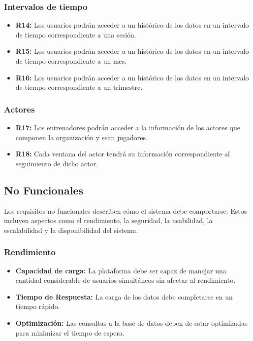 \subsubsection{Intervalos de tiempo}
\begin{itemize}
    \item \textbf{R14:} Los usuarios podrán acceder a un histórico de los datos en un intervalo de tiempo correspondiente a una sesión.
    
    \item \textbf{R15:} Los usuarios podrán acceder a un histórico de los datos en un intervalo de tiempo correspondiente a un mes.
    
    \item \textbf{R16:} Los usuarios podrán acceder a un histórico de los datos en un intervalo de tiempo correspondiente a un trimestre.
    
\end{itemize}

\subsubsection{Actores}
\begin{itemize}
    \item \textbf{R17:} Los entrenadores podrán acceder a la información de los actores que componen la organización y sean jugadores.
    
    \item \textbf{R18:} Cada ventana del actor tendrá su información correspondiente al seguimiento de dicho actor.
    
\end{itemize}

\subsection{No Funcionales}
Los requisitos no funcionales describen cómo el sistema debe comportarse. Estos incluyen aspectos como el rendimiento, la seguridad, la usabilidad, la escalabilidad y la disponibilidad del sistema.

\subsubsection{Rendimiento}
\begin{itemize}
    \item \textbf{Capacidad de carga:} La plataforma debe ser capaz de manejar una cantidad considerable de usuarios simultáneos sin afectar al rendimiento.
    
    \item \textbf{Tiempo de Respuesta:} La carga de los datos debe completarse en un tiempo rápido.
    
    \item \textbf{Optimización:} Las consultas a la base de datos deben de estar optimizadas para minimizar el tiempo de espera.
    
\end{itemize}

